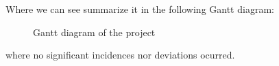 \newpage
Where we can see summarize it in the following Gantt diagram:
\begin{figure}[H]
    
    \caption[Project's Gantt diagram]{\footnotesize{Gantt diagram of the project}}
    \label{fig:gantt}
\end{figure}
where no significant incidences nor deviations ocurred.
\bigskip

